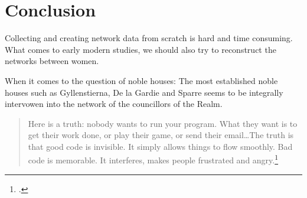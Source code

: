 \section{Conclusion}
Collecting and creating network data from scratch is hard and time consuming. 
What comes to early modern studies, we should also try to reconstruct the networks between women. 

When it comes to the question of noble houses: The most established noble houses such as Gyllenstierna, De la Gardie and Sparre seems to be integrally intervowen into the network of the councillors of the Realm.

\begin{quote}
	Here is a truth: nobody wants to run your program. What they want is to get their work done, or play their game, or send their email\ldots The truth is that good code is invisible. It simply allows things to flow smoothly. Bad code is memorable. It interferes, makes people frustrated and angry.\footcite[prefix p. XVI]{python}
\end{quote}

